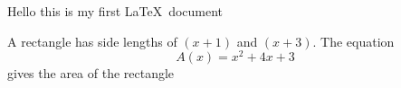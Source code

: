 \documentclass[11px]{article}
\begin{document}
Hello this is my first \LaTeX\ document

A rectangle has side lengths of $(x+1)$ and $(x+3)$.
The equation $${A(x)=x^2+4x+3}$$ gives the area of the rectangle
\end{document}
